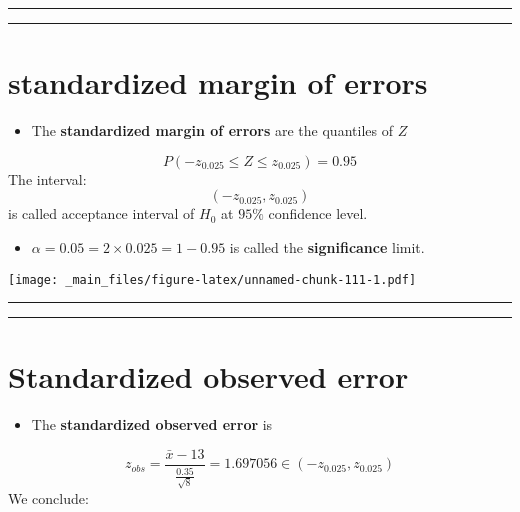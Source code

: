 \documentclass[
]{book}
\providecommand{\tightlist}{%
  \setlength{\itemsep}{0pt}\setlength{\parskip}{0pt}}
\begin{document}
\begin{center}\rule{0.5\linewidth}{0.5pt}\end{center}

\begin{center}\rule{0.5\linewidth}{0.5pt}\end{center}

\hypertarget{standardized-margin-of-errors}{%
\section{standardized margin of errors}\label{standardized-margin-of-errors}}

\begin{itemize}
\tightlist
\item
  The \textbf{standardized margin of errors} are the quantiles of \(Z\)
\end{itemize}

\[P(-z_{0.025} \leq Z \leq z_{0.025})=0.95\]
The interval: \[(-z_{0.025}, z_{0.025})\] is called acceptance interval of \(H_0\) at \(95\%\) confidence level.

\begin{itemize}
\tightlist
\item
  \(\alpha=0.05=2\times 0.025=1-0.95\) is called the \textbf{significance} limit.
\end{itemize}

\texttt{[image: \_main\_files/figure-latex/unnamed-chunk-111-1.pdf]}

\begin{center}\rule{0.5\linewidth}{0.5pt}\end{center}

\begin{center}\rule{0.5\linewidth}{0.5pt}\end{center}

\hypertarget{standardized-observed-error}{%
\section{Standardized observed error}\label{standardized-observed-error}}

\begin{itemize}
\tightlist
\item
  The \textbf{standardized observed error} is
\end{itemize}

\[z_{obs}=\frac{\bar{x}-13}{\frac{0.35}{\sqrt{8}}}=1.697056 \in (-z_{0.025}, z_{0.025})\]
We conclude:
\end{document}
